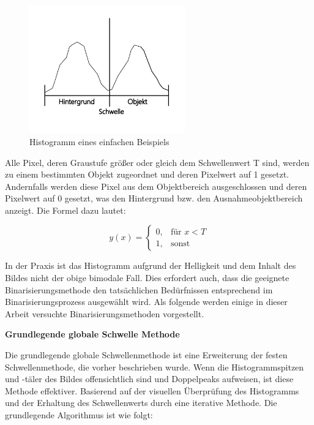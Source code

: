 \begin{figure}[htb]
 \centering 
  \includegraphics[keepaspectratio,width=0.6\textwidth]{images/4_ZweiteErfahrung/Binar/bia.pdf}
 \caption{Histogramm eines einfachen Beispiels}
 \label{fig:Histogramm eines einfachen Beispiels}
\end{figure} 

Alle Pixel, deren Graustufe größer oder gleich dem Schwellenwert T sind, werden zu einem bestimmten Objekt zugeordnet und deren Pixelwert auf 1 gesetzt. Andernfalls werden diese Pixel aus dem Objektbereich ausgeschlossen und deren Pixelwert auf 0 gesetzt, was den Hintergrund bzw. den Ausnahmeobjektbereich anzeigt. Die Formel dazu lautet:

\begin{equation}
  y(x) =
  \begin{cases} 
  0,   & \mbox{für }x < T \\
  1, & \mbox{sonst}
  \end{cases}
\end{equation}

In der Praxis ist das Histogramm aufgrund der Helligkeit und dem Inhalt des Bildes nicht der obige bimodale Fall. Dies erfordert auch, dass die geeignete Binarisierungsmethode den tatsächlichen Bedürfnissen entsprechend im Binarisierungsprozess ausgewählt wird. Als folgende werden einige in dieser Arbeit versuchte Binarisierungsmethoden vorgestellt.

\textbf{Grundlegende globale Schwelle Methode}

Die grundlegende globale Schwellenmethode ist eine Erweiterung der festen Schwellenmethode, die vorher beschrieben wurde. Wenn die Histogrammspitzen und -täler des Bildes offensichtlich sind und Doppelpeaks aufweisen, ist diese Methode effektiver. Basierend auf der visuellen Überprüfung des Histogramms und der Erhaltung des Schwellenwerts durch eine iterative Methode. Die grundlegende Algorithmus \cite{global} ist wie folgt:

